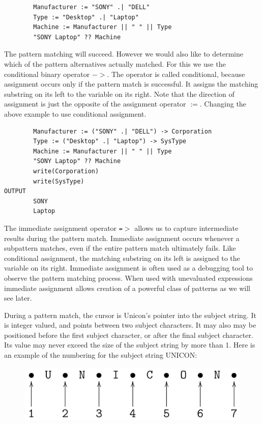 \documentclass[letterpaper,12pt]{article}
\begin{document}
\begin{verbatim}
        Manufacturer := "SONY" .| "DELL"
        Type := "Desktop" .| "Laptop"
        Machine := Manufacturer || " " || Type
        "SONY Laptop" ?? Machine
\end{verbatim}

The pattern matching will succeed. However we would also like to
determine which of the pattern alternatives actually matched. For this
we use the conditional binary operator \(-\!\!>\). The operator is
called conditional, because assignment occurs only if the pattern
match is successful. It assigns the matching substring on its left to
the variable on its right. Note that the direction of assignment is
just the opposite of the assignment operator $:=$. Changing the above
example to use conditional assignment.

\begin{verbatim}
        Manufacturer := ("SONY" .| "DELL") -> Corporation
        Type := ("Desktop" .| "Laptop") -> SysType
        Machine := Manufacturer || " " || Type
        "SONY Laptop" ?? Machine
        write(Corporation)
        write(SysType)
OUTPUT
        SONY
        Laptop
\end{verbatim}

The immediate assignment operator \texttt{=$>$} allows us to capture
intermediate results during the pattern match. Immediate assignment
occurs whenever a subpattern matches, even if the entire pattern match
ultimately fails. Like conditional assignment, the matching substring
on its left is assigned to the variable on its right. Immediate
assignment is often used as a debugging tool to observe the pattern
matching process. When used with unevaluated expressions immediate
assignment allows creation of a powerful class of patterns as we will
see later.

During a pattern match, the cursor is Unicon's pointer into the
subject string. It is integer valued, and points between two subject
characters. It may also may be positioned before the first subject
character, or after the final subject character. Its value may never
exceed the size of the subject string by more than 1.  Here is an
example of the numbering for the subject string UNICON:

\begin{figure}[h]
\centering
\includegraphics[width=\linewidth]{poscurs.png}
\end{figure}
\end{document}

